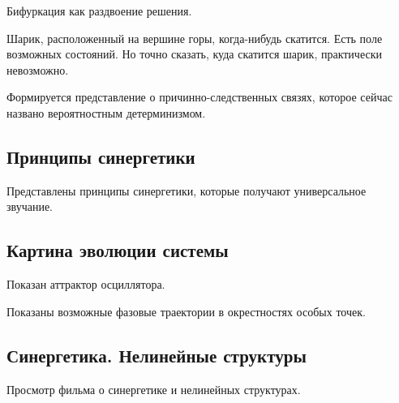 \documentclass[main.tex]{subfiles}
\begin{document}
Бифуркация как раздвоение решения.

Шарик, расположенный на вершине горы, когда-нибудь скатится.
Есть поле возможных состояний.
Но точно сказать, куда скатится шарик, практически невозможно.

Формируется представление о причинно-следственных связях, которое сейчас названо вероятностным детерминизмом.

\subsection{Принципы синергетики}


Представлены принципы синергетики, которые получают универсальное звучание.

\subsection{Картина эволюции системы}



Показан аттрактор осциллятора.

Показаны возможные фазовые траектории в окрестностях особых точек.


\subsection{Синергетика. Нелинейные структуры}


Просмотр фильма о синергетике и нелинейных структурах.
\end{document}

